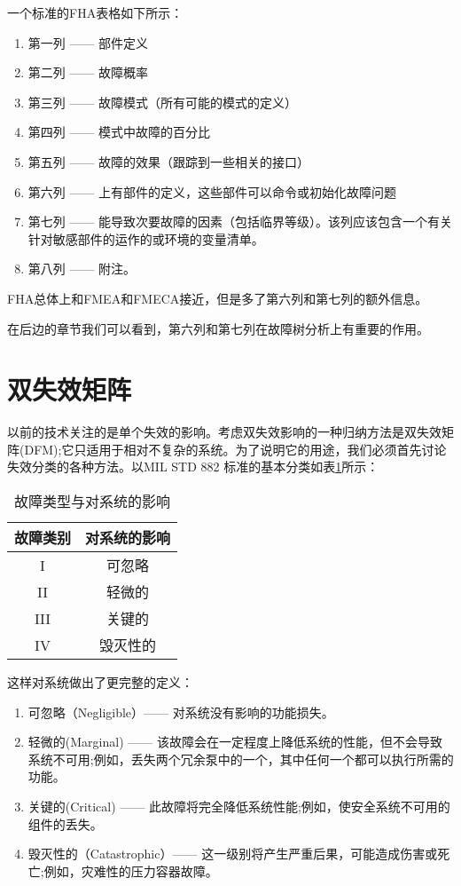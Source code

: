 \documentclass[cn,11pt,chinese]{elegantbook}
\begin{document}
一个标准的FHA表格如下所示：

\begin{enumerate}
	\item 第一列 —— 部件定义
	\item 第二列 —— 故障概率
	\item 第三列 —— 故障模式（所有可能的模式的定义）
	\item 第四列 —— 模式中故障的百分比
	\item 第五列 —— 故障的效果（跟踪到一些相关的接口）
	\item 第六列 —— 上有部件的定义，这些部件可以命令或初始化故障问题
	\item 第七列 —— 能导致次要故障的因素（包括临界等级）。该列应该包含一个有关针对敏感部件的运作的或环境的变量清单。
	\item 第八列 —— 附注。
\end{enumerate}

FHA总体上和FMEA和FMECA接近，但是多了第六列和第七列的额外信息。

在后边的章节我们可以看到，第六列和第七列在故障树分析上有重要的作用。

\section{双失效矩阵}

以前的技术关注的是单个失效的影响。考虑双失效影响的一种归纳方法是双失效矩阵(DFM);它只适用于相对不复杂的系统。为了说明它的用途，我们必须首先讨论失效分类的各种方法。以MIL STD 882 标准的基本分类如表\ref{tab:tab2_2}所示：


\begin{table}[htpb]
	\caption{故障类型与对系统的影响}\label{tab:tab2_2}
	\centering
	\begin{tabular}{@{}cc@{}}
		\toprule
		故障类别 & 对系统的影响 \\ \midrule
		I    & 可忽略    \\
		II   & 轻微的    \\
		III  & 关键的    \\
		IV   & 毁灭性的   \\ \bottomrule
	\end{tabular}
\end{table}

这样对系统做出了更完整的定义：

\begin{enumerate}
	\item 可忽略（Negligible）—— 对系统没有影响的功能损失。
	\item 轻微的(Marginal) —— 该故障会在一定程度上降低系统的性能，但不会导致系统不可用;例如，丢失两个冗余泵中的一个，其中任何一个都可以执行所需的功能。
	\item 关键的(Critical) —— 此故障将完全降低系统性能;例如，使安全系统不可用的组件的丢失。
	\item 毁灭性的（Catastrophic）—— 这一级别将产生严重后果，可能造成伤害或死亡;例如，灾难性的压力容器故障。
\end{enumerate}
\end{document}
